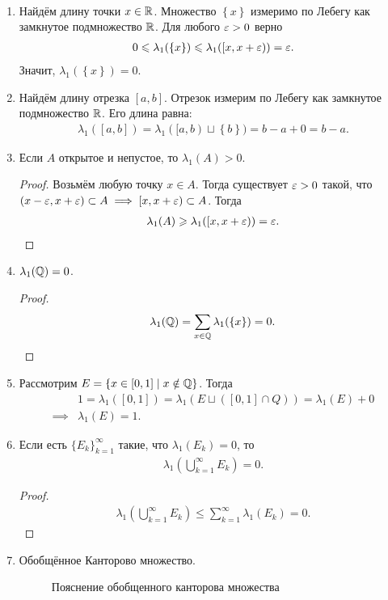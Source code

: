 \begin{exmpl}\
 \begin{enumerate}
  \item Найдём длину точки $x \in \mathbb{R}$. Множество $\left\{ x \right\}$ измеримо по Лебегу как замкнутое подмножество $\mathbb{R}$. Для любого $\varepsilon > 0$ верно
   \begin{align*}
    0 \leqslant \lambda_1(\left\{ x \right\}) \leqslant \lambda_1([x, x + \varepsilon)) = \varepsilon
   .\end{align*} Значит, $\lambda_1(\left\{ x \right\}) = 0$.

  \item Найдём длину отрезка $[a,b]$. Отрезок измерим по Лебегу как замкнутое подмножество $\mathbb{R}$. Его длина равна:
   \begin{align*}
    \lambda_1([a,b]) = \lambda_1([a,b) \sqcup \left\{ b \right\}) = b - a + 0 = b - a
   .\end{align*}
  \item Если $A$ открытое и непустое, то $\lambda_1(A) > 0$.
   \begin{proof}
    Возьмём любую точку $x \in A$. Тогда существует $\varepsilon > 0$ такой, что $(x - \varepsilon, x + \varepsilon) \subset A \implies [x, x + \varepsilon) \subset A$. Тогда
    \begin{align*}
     \lambda_1(A) \geqslant \lambda_1([x,x+\varepsilon)) = \varepsilon
    .\end{align*} 
   \end{proof}
  \item $\lambda_1(\mathbb{Q}) = 0$.
   \begin{proof}
    \begin{align*}
     \lambda_1(\mathbb{Q}) = \sum_{x \in \mathbb{Q}} \lambda_1(\left\{ x \right\}) = 0
    .\end{align*}
   \end{proof}
  \item Рассмотрим $E = \left\{ x \in [0,1] \mid x \notin \mathbb{Q} \right\}$. Тогда
   \begin{align*}
    &1 = \lambda_1([0,1]) = \lambda_1(E \sqcup ([0,1] \cap Q)) = \lambda_1(E) + 0 \\
    \implies &\lambda_1(E) = 1.
   \end{align*} 
  \item Если есть $\{E_{k}\}_{k=1}^{\infty} $ такие, что $\lambda_1(E_k) = 0$, то
   \begin{align*}
    \lambda_1 \left( \bigcup_{k=1}^{\infty} E_k \right) = 0
   .\end{align*}
   \begin{proof}
    \begin{align*}
     \lambda_1 \left( \bigcup_{k=1}^{\infty} E_k \right) \leqslant \sum_{k=1}^{\infty} \lambda_1(E_k) = 0
    .\end{align*}
   \end{proof}
  \item Обобщённое Канторово множество.
   \begin{figure}[ht]
    \centering
    \caption{Пояснение обобщенного канторова множества}
    \label{fig:пояснение-обобщенного-канторова-множества}
   \end{figure}


\end{enumerate}
\end{exmpl}
